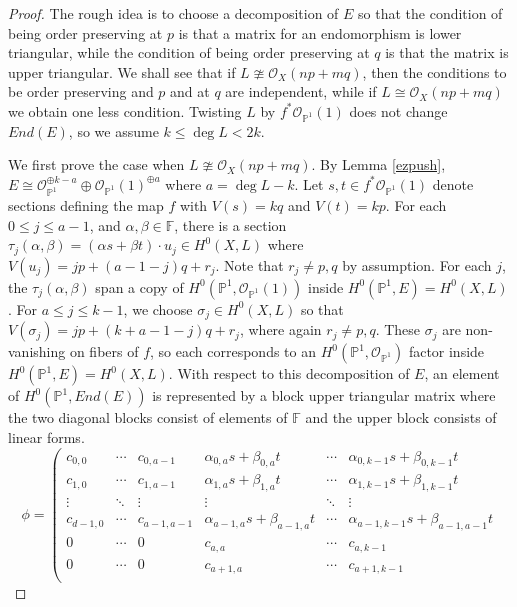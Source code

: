 \documentclass[12pt]{amsart}
\newcommand{\cc}{\mathbb{F}}
\newcommand{\pp}{\mathbb{P}}
\renewcommand{\O}{\mathscr{O}}
\theoremstyle{definition}
\theoremstyle{remark}
\theoremstyle{remark}
\numberwithin{equation}{section}
\begin{document}
 \begin{proof}
 The rough idea is to choose a decomposition of $E$ so that the condition of being order preserving at $p$ is that a matrix for an endomorphism is lower triangular, while the condition of being order preserving at $q$ is that the matrix is upper triangular. We shall see that if $L \ncong \O_X(np + mq)$, then the conditions to be order preserving and $p$ and at $q$ are independent, while if 
 $L \cong \O_X(np + mq)$ we obtain one less condition.
Twisting $L$ by $f^*\O_{\pp^1}(1)$ does not change $End(E)$, so we assume $k \leq \deg L < 2k$.
 
We first prove the case when $L \ncong \O_X(np + mq)$. 
By Lemma \ref{ezpush}, $E \cong \O_{\pp^1}^{\oplus k-a} \oplus \O_{\pp^1}(1)^{\oplus a}$ where $a = \deg L - k$.
Let $s, t \in f^*\O_{\pp^1}(1)$ denote sections defining the map $f$ with $V(s) = kq$ and $V(t) = kp$. For each $0 \leq j \leq a-1$, and $\alpha, \beta \in \cc$, there is a section $\tau_j(\alpha, \beta)= (\alpha s + \beta t) \cdot u_j \in H^0(X, L)$
 where $V(u_j) = jp + (a-1-j)q + r_j$. Note that $r_j \neq p, q$ by assumption. For each $j$, the $\tau_j(\alpha, \beta)$ span a copy of $H^0(\pp^1, \O_{\pp^1}(1))$ inside $H^0(\pp^1, E) = H^0(X, L)$. For $a \leq j \leq k-1$, we choose $\sigma_j \in H^0(X, L)$ so that $V(\sigma_j) =  jp + (k+a-1-j)q + r_j$, where again $r_j \neq p,q$. 
These $\sigma_j$ are non-vanishing on fibers of $f$, so each corresponds to an $H^0(\pp^1, \O_{\pp^1})$ factor inside $H^0(\pp^1, E) = H^0(X, L)$.
With respect to this decomposition of $E$, an element of $H^0(\pp^1, End(E))$ is represented by a block upper triangular matrix where the two diagonal blocks consist of elements of $\cc$ and the upper block consists of linear forms.
 \begin{equation} \label{mat}
\phi =  \left( \begin{matrix}
 c_{0,0} & \cdots & c_{0,a-1} & \alpha_{0, a} s + \beta_{0, a} t & \cdots & \alpha_{0, k-1} s + \beta_{0, k-1}t \\
  c_{1,0} & \cdots & c_{1,a-1} & \alpha_{1, a} s + \beta_{1, a} t & \cdots & \alpha_{1, k-1} s + \beta_{1, k-1}t \\
  \vdots & \ddots & \vdots & \vdots & \ddots & \vdots \\
   c_{d-1,0} & \cdots & c_{a-1,a-1} & \alpha_{a-1, a} s + \beta_{a-1, a} t & \cdots & \alpha_{a-1, k-1} s + \beta_{a-1, a-1}t \\
   0 & \cdots & 0 & c_{a,a} & \cdots & c_{a,k-1} \\
   0 & \cdots & 0 & c_{a+1,a} & \cdots & c_{a+1,k-1} \\

\end{matrix}
\end{equation}
\end{proof}
\end{document}
